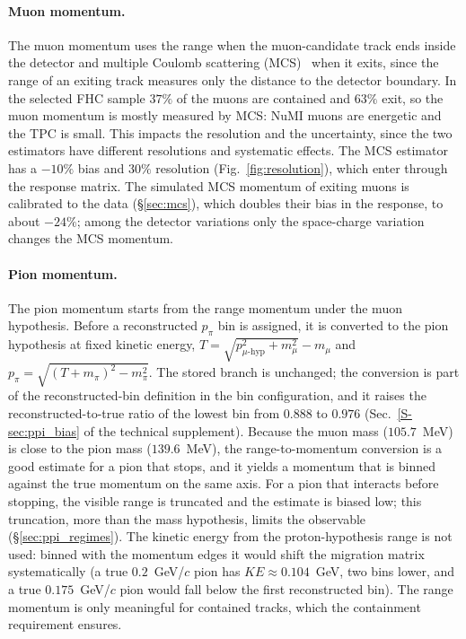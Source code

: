 \documentclass[11pt,a4paper]{article}
\newcommand{\suppref}[2]{#1~\ref{S-#2} of the technical supplement}
\begin{document}
\paragraph{Muon momentum.}
The muon momentum uses the range when the muon-candidate track ends inside the detector and
multiple Coulomb scattering (MCS)~\cite{uboone_mcs} when it exits, since the range of an exiting
track measures only the distance to the detector boundary. In the selected FHC sample $37\%$ of the
muons are contained and $63\%$ exit, so the muon momentum is mostly measured by MCS: NuMI muons are
energetic and the TPC is small. This impacts the resolution and the uncertainty, since the
two estimators have different resolutions and systematic effects. The MCS estimator has a $-10\%$
bias and $30\%$ resolution (Fig.~\ref{fig:resolution}), which enter through the response matrix.
The simulated MCS momentum of exiting muons is calibrated to the data (\S\ref{sec:mcs}), which doubles their
bias in the response, to about $-24\%$; among the detector variations only the space-charge variation changes the
MCS momentum.

\paragraph{Pion momentum.}
The pion momentum starts from the range momentum under the muon hypothesis. Before a
reconstructed $p_\pi$ bin is assigned, it is converted to the pion hypothesis at fixed kinetic
energy, $T=\sqrt{p_{\mu\text{-hyp}}^2+m_\mu^2}-m_\mu$ and $p_\pi=\sqrt{(T+m_\pi)^2-m_\pi^2}$. The
stored branch is unchanged; the conversion is part of the reconstructed-bin definition in the bin
configuration, and it raises the reconstructed-to-true ratio of the lowest bin from $0.888$ to
$0.976$ (\suppref{Sec.}{sec:ppi_bias}). Because the muon mass ($105.7$~MeV) is close to the pion
mass ($139.6$~MeV), the range-to-momentum conversion is a good estimate for a pion that stops, and
it yields a momentum that is binned against the true momentum on the same axis. For a pion that
interacts before stopping, the visible range is truncated and the estimate is biased low; this
truncation, more than the mass hypothesis, limits the observable (\S\ref{sec:ppi_regimes}). The kinetic energy
from the proton-hypothesis range is not used: binned with the momentum edges it would shift the
migration matrix systematically (a true $0.2$~GeV/$c$ pion has $KE\approx0.104$~GeV, two bins
lower, and a true $0.175$~GeV/$c$ pion would fall below the first reconstructed bin). The range
momentum is only meaningful for contained tracks, which the containment requirement ensures.
\end{document}
